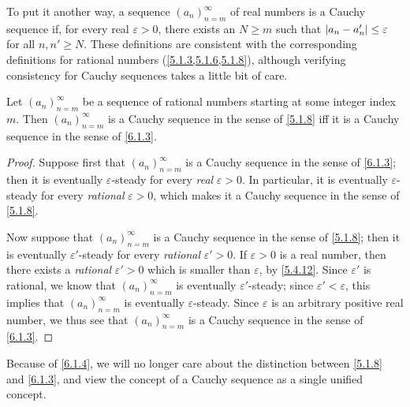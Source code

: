\begin{note}
  To put it another way, a sequence \((a_n)_{n = m}^\infty\) of real numbers is a Cauchy sequence if, for every real \(\varepsilon > 0\), there exists an \(N \geq m\) such that \(\left\lvert a_n - a_n'\right\rvert \leq \varepsilon\) for all \(n, n' \geq N\).
  These definitions are consistent with the corresponding definitions for rational numbers (\cref{5.1.3,5.1.6,5.1.8}), although verifying consistency for Cauchy sequences takes a little bit of care.
\end{note}

\begin{prop}\label{6.1.4}
  Let \((a_n)_{n = m}^\infty\) be a sequence of rational numbers starting at some integer index \(m\).
  Then \((a_n)_{n = m}^\infty\) is a Cauchy sequence in the sense of \cref{5.1.8} iff it is a Cauchy sequence in the sense of \cref{6.1.3}.
\end{prop}

\begin{proof}
  Suppose first that \((a_n)_{n = m}^\infty\) is a Cauchy sequence in the sense of \cref{6.1.3};
  then it is eventually \(\varepsilon\)-steady for every \emph{real} \(\varepsilon > 0\).
  In particular, it is eventually \(\varepsilon\)-steady for every \emph{rational} \(\varepsilon > 0\), which makes it a Cauchy sequence in the sense of \cref{5.1.8}.

  Now suppose that \((a_n)_{n = m}^\infty\) is a Cauchy sequence in the sense of \cref{5.1.8};
  then it is eventually \(\varepsilon'\)-steady for every \emph{rational} \(\varepsilon' > 0\).
  If \(\varepsilon > 0\) is a real number, then there exists a \emph{rational} \(\varepsilon' > 0\) which is smaller than \(\varepsilon\), by \cref{5.4.12}.
  Since \(\varepsilon'\) is rational, we know that \((a_n)_{n = m}^\infty\) is eventually \(\varepsilon'\)-steady;
  since \(\varepsilon' < \varepsilon\), this implies that \((a_n)_{n = m}^\infty\) is eventually \(\varepsilon\)-steady.
  Since \(\varepsilon\) is an arbitrary positive real number, we thus see that \((a_n)_{n = m}^\infty\) is a Cauchy sequence in the sense of \cref{6.1.3}.
\end{proof}

\begin{note}
  Because of \cref{6.1.4}, we will no longer care about the distinction between \cref{5.1.8} and \cref{6.1.3}, and view the concept of a Cauchy sequence as a single unified concept.
\end{note}

